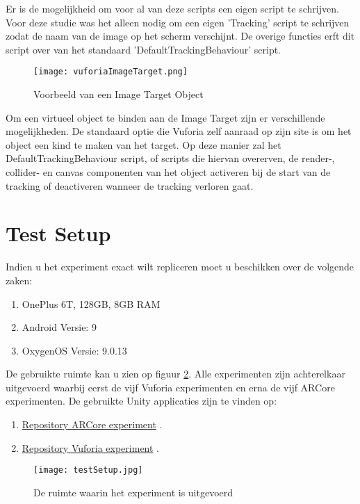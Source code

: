 Er is de mogelijkheid om voor al van deze scripts een eigen script te schrijven. Voor deze studie was het alleen nodig om een eigen 'Tracking' script te schrijven zodat de naam van de image op het scherm verschijnt. De overige functies erft dit script over van het standaard 'DefaultTrackingBehaviour' script.

\begin{figure}
    \texttt{[image: vuforiaImageTarget.png]}
    \caption{Voorbeeld van een Image Target Object}
    \label{fig:vuforiaImageTarget}
\end{figure}

Om een virtueel object te binden aan de Image Target zijn er verschillende mogelijkheden. De standaard optie die Vuforia zelf aanraad op zijn site is om het object een kind te maken van het target. Op deze manier zal het DefaultTrackingBehaviour script, of scripts die hiervan overerven, de render-, collider- en canvas componenten van het object activeren bij de start van de tracking of deactiveren wanneer de tracking verloren gaat.

\section{Test Setup}
Indien u het experiment exact wilt repliceren moet u beschikken over de volgende zaken:

\begin{enumerate}
    \item OnePlus 6T, 128GB, 8GB RAM
    \item Android Versie: 9
    \item OxygenOS Versie: 9.0.13
\end{enumerate}

De gebruikte ruimte kan u zien op figuur \ref{fig:testSetup}. Alle experimenten zijn achterelkaar uitgevoerd waarbij eerst de vijf Vuforia experimenten en erna de vijf ARCore experimenten. De gebruikte Unity applicaties zijn te vinden op:
\begin{enumerate}
    \item \href{https://github.com/MatthiasDeFre/ARCore-Experiment}{Repository ARCore experiment} \autocite{GITHUBARCORE}.
      \item \href{https://github.com/MatthiasDeFre/Vuforia-Experiment}{Repository Vuforia experiment} \autocite{GITHUBVUFORIA}.
\end{enumerate}
\begin{figure}
    \texttt{[image: testSetup.jpg]}
    \caption{De ruimte waarin het experiment is uitgevoerd}
    \label{fig:testSetup}
\end{figure}
